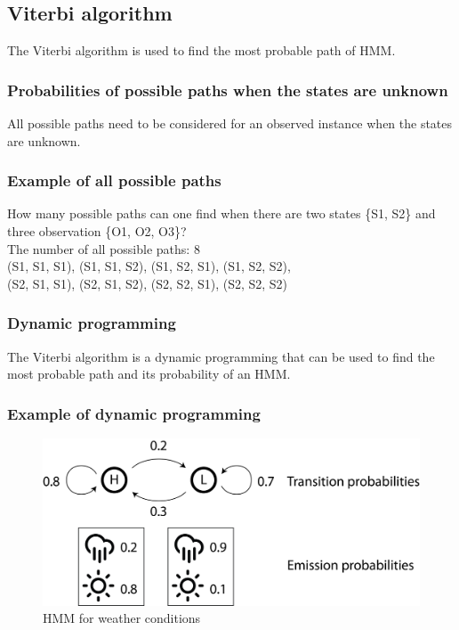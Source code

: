 %
%

%
%
\subsection{Viterbi algorithm}
The Viterbi algorithm is used to find the most probable path of HMM.

%
%
\subsubsection*{Probabilities of possible paths when the states are unknown}
All possible paths need to be considered for an observed instance when the states are unknown. 

%
%
\subsubsection*{Example of all possible paths}
How many possible paths can one find when there are two states \{S1, S2\} and three observation \{O1, O2, O3\}? \\

\noindent
The number of all possible paths: 8 \\
(S1, S1, S1), (S1, S1, S2), (S1, S2, S1), (S1, S2, S2), \\
(S2, S1, S1), (S2, S1, S2), (S2, S2, S1), (S2, S2, S2)

%
%
\subsubsection*{Dynamic programming}
The Viterbi algorithm is a dynamic programming that can be used to find the most probable path and its probability of an HMM.

%
%
\subsubsection*{Example of dynamic programming}
\begin{figure}[H]
  \centering
      \includegraphics[width=0.5 \textwidth]{fig13/HMM_example.png}
  \caption{HMM for weather conditions}
\end{figure}

